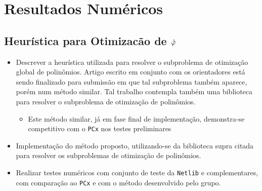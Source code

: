 \chapter{Resultados Numéricos}
\label{chap:numerical}

\section{Heurística para Otimizacão \texorpdfstring{de $\hat{\varphi}$}{da função de mérito}}


\begin{itemize}
\item Descrever a heurística utilizada para resolver o subproblema de otimização
global de polinômios. Artigo escrito em conjunto com os orientadores está sendo
finalizado para submissão em que tal subproblema também aparece, porém num
método similar. Tal trabalho contempla também uma biblioteca para resolver o
subproblema de otimização de polinômios.
\begin{itemize}
  \item Este método similar, já em fase final de implementação,
  demonstra-se competitivo com o \texttt{PCx} nos testes preliminares
 \end{itemize}
\item Implementação do método proposto, utilizando-se da biblioteca supra
citada para resolver os subproblemas de otimização de polinômios.
\item Realizar  testes
numéricos com conjunto de teste da \texttt{Netlib} e complementares, com
comparação ao \texttt{PCx} e com o método desenvolvido pelo grupo.
\end{itemize}

